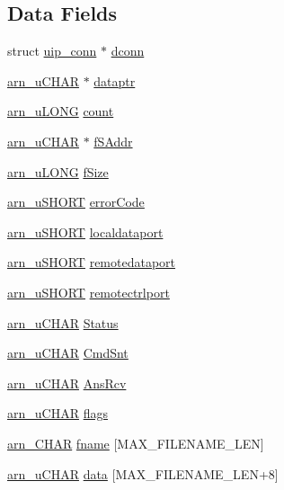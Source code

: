 \subsection*{Data Fields}
\begin{DoxyCompactItemize}
\item 
struct \hyperlink{structuip__conn}{uip\_\-conn} $\ast$ \hyperlink{structftp__state_aa78fbc165cc68a2797d9b38448ebe101}{dconn}
\item 
\hyperlink{group__ftp_ga748121386e994966f8a87f4160f055b4}{arn\_\-uCHAR} $\ast$ \hyperlink{group__ftp_gaafd205f52235c549ebeda2c92d60c17d}{dataptr}
\item 
\hyperlink{group__ftp_ga8b49fa3351457a2ef5c6f2b84c227953}{arn\_\-uLONG} \hyperlink{group__ftp_ga705b43b8713c16ed6c2375f7cbb88f21}{count}
\item 
\hyperlink{group__ftp_ga748121386e994966f8a87f4160f055b4}{arn\_\-uCHAR} $\ast$ \hyperlink{group__ftp_gac0c7f95f2f266647b5977451d83be1e3}{fSAddr}
\item 
\hyperlink{group__ftp_ga8b49fa3351457a2ef5c6f2b84c227953}{arn\_\-uLONG} \hyperlink{group__ftp_ga7f29a23ccdd3a4c3ba2208d6392eb452}{fSize}
\item 
\hyperlink{group__ftp_gaa290e3b930f0eff7f256b787fdbe02dc}{arn\_\-uSHORT} \hyperlink{group__ftp_gab56dd9f99723858913198075ba43c2aa}{errorCode}
\item 
\hyperlink{group__ftp_gaa290e3b930f0eff7f256b787fdbe02dc}{arn\_\-uSHORT} \hyperlink{group__ftp_ga66a09edc48c8850976a82d1cbe55a54b}{localdataport}
\item 
\hyperlink{group__ftp_gaa290e3b930f0eff7f256b787fdbe02dc}{arn\_\-uSHORT} \hyperlink{group__ftp_ga0aead28a817643dacb4df95807ab8ddf}{remotedataport}
\item 
\hyperlink{group__ftp_gaa290e3b930f0eff7f256b787fdbe02dc}{arn\_\-uSHORT} \hyperlink{group__ftp_gad9ad023f58a17a9adc147882890aa84c}{remotectrlport}
\item 
\hyperlink{group__ftp_ga748121386e994966f8a87f4160f055b4}{arn\_\-uCHAR} \hyperlink{group__ftp_gaaa4d97116ea038c00c8909bffd58129f}{Status}
\item 
\hyperlink{group__ftp_ga748121386e994966f8a87f4160f055b4}{arn\_\-uCHAR} \hyperlink{group__ftp_ga44d3b63ea7baa07d6743e145f06d2589}{CmdSnt}
\item 
\hyperlink{group__ftp_ga748121386e994966f8a87f4160f055b4}{arn\_\-uCHAR} \hyperlink{group__ftp_ga4308157292a9948553f531a8b4f78c67}{AnsRcv}
\item 
\hyperlink{group__ftp_ga748121386e994966f8a87f4160f055b4}{arn\_\-uCHAR} \hyperlink{group__ftp_ga86be9ef59e2087fdbfdb4886f5289e5c}{flags}
\item 
\hyperlink{group__ftp_gab7c92ee10c15b851350edb8a4a3bb708}{arn\_\-CHAR} \hyperlink{group__ftp_gadc6947ba105e712aad11b7c35604d89c}{fname} \mbox{[}MAX\_\-FILENAME\_\-LEN\mbox{]}
\item 
\hyperlink{group__ftp_ga748121386e994966f8a87f4160f055b4}{arn\_\-uCHAR} \hyperlink{group__ftp_ga3b5f7f0b0f4175c56c7107cfdb51d1ea}{data} \mbox{[}MAX\_\-FILENAME\_\-LEN+8\mbox{]}
\end{DoxyCompactItemize}



